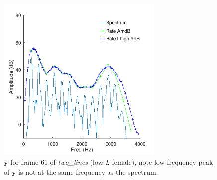 \documentclass{article}
\begin{document}
\begin{figure}[h]
\caption{$\mathbf{y}$ for frame 61 of \emph{two\_lines} (low $L$ female), note low frequency peak of $\mathbf{y}$ is not at the same frequency as the spectrum. }
\label{fig:ratek7_two_lines_61}
\begin{center}
\includegraphics[width=8cm]{ratek7_two_lines_61.png}
\end{center}
\end{figure}
\end{document}
